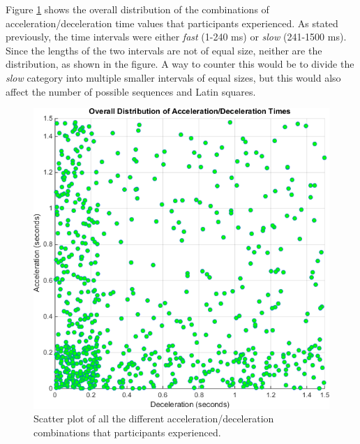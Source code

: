 Figure \ref{fig:overallDistribution} shows the overall distribution of the combinations of acceleration/deceleration time values that participants experienced. As stated previously, the time intervals were either \textit{fast} (1-240 ms) or \textit{slow} (241-1500 ms). Since the lengths of the two intervals are not of equal size, neither are the distribution, as shown in the figure. A way to counter this would be to divide the \textit{slow} category into multiple smaller intervals of equal sizes, but this would also affect the number of possible sequences and Latin squares.



\begin{figure}[htbp]
\centering
\includegraphics[width=0.55\columnwidth]{Pics/Classes/overall_distribution}
\caption{Scatter plot of all the different acceleration/deceleration combinations that participants experienced.}
\label{fig:overallDistribution}
\end{figure}

